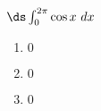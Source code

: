 {$\ds \int_{0}^{2\pi} \cos x\ dx$}
{\begin{enumerate}
\item		$0$
\item		$0$
\item		$0$
\end{enumerate}
}